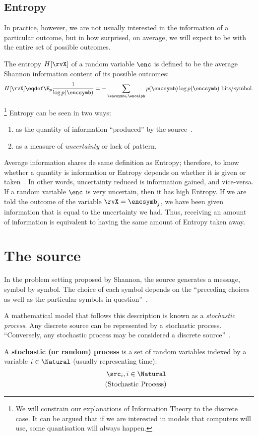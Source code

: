 \subsection{Entropy} In practice, however, we are not usually interested in the information of a particular outcome, but in how surprised, on average, we will expect to be with the entire set of possible outcomes.
\begin{definition}
	The entropy \(H[\rvX]\) of a random variable \(\enc\) is defined to be the average Shannon information content of its possible outcomes:
	\begin{align}
		H[\rvX] \eqdef \E_p \frac{1}{\log p(\encsymb)} = -\sum_{\encsymb \in \encalph} p(\encsymb) \log p(\encsymb) \text{ bits/symbol}.
	\label{eq:entropy} \end{align}
\end{definition}
\footnote{We will constrain our explanations of Information Theory to the discrete case. It can be argued that if we are interested in models that computers will use, some quantisation will always happen.}
Entropy can be seen in two ways:
\begin{enumerate}
	\item as the quantity of information ``produced'' by the source~\cite[p.18]{shannon:1949}.
	\item as a measure of \emph{uncertainty} or lack of pattern.
\end{enumerate}
Average information shares de same definition as Entropy; therefore, to know whether a quantity is information or Entropy depends on whether it is given or taken~\cite{stone:2015}. In other words, uncertainty reduced is information gained, and vice-versa. If a random variable \(\enc\) is very uncertain, then it has high Entropy. If we are told the outcome of the variable \(\rvX = \encsymb_j\), we have been given information that is equal to the uncertainty we had. Thus, receiving an amount of information is equivalent to having the same amount of Entropy taken away.

\section{The source} In the problem setting proposed by Shannon, the source generates a message, symbol by symbol. The choice of each symbol depends on the ``preceding choices as well as the particular symbols in question''~\cite[p.10]{shannon:1949}.

A mathematical model that follows this description is known as a \emph{stochastic process}. Any discrete source can be represented by a stochastic process. ``Conversely, any stochastic process may be considered a discrete source''~\cite{shannon:1949}.
\begin{definition}
	A \textbf{stochastic (or random) process} is a set of random variables indexed by a variable \(i \in \Natural\) (usually representing time):
	\begin{align}
		{\src_i}, i \in \Natural \\
		\tag{Stochastic Process}
	\end{align}
\end{definition}


